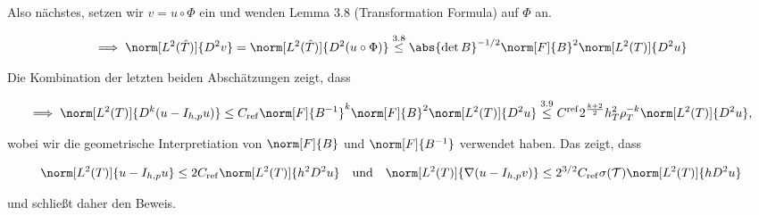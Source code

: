 \begin{solution}
\begin{enumerate}[label = \textbf{\alph*)}]
\begin{enumerate}[label = \arabic*.]
    Also nächstes, setzen wir $v = u \circ \Phi$ ein und wenden Lemma 3.8 (Transformation Formula) auf $\Phi$ an.

    \begin{align*}
      \implies
      \norm[L^2(\hat T)]{D^2 v}
      =
      \norm[L^2(\hat T)]{D^2 (u \circ \Phi)}
      \stackrel
      {
        \mathrm{3.8}
      }{\leq}
      \abs{\det B}^{-1/2} \norm[F]{B}^2 \norm[L^2(T)]{D^2 u}
    \end{align*}

    Die Kombination der letzten beiden Abschätzungen zeigt, dass

    \begin{align*}
      \implies
      \norm[L^2(T)]{D^k (u - I_{h, p} u)}
      \leq
      C_\mathrm{ref} \norm[F]{B^{-1}}^k \norm[F]{B}^2 \norm[L^2(T)]{D^2 u}
      \stackrel
      {
        \mathrm{3.9}
      }{\leq}
      C^\mathrm{ref} 2^\frac{k+2}{2} h_T^2 \rho_T^{-k} \norm[L^2(T)]{D^2 u},
    \end{align*}

    wobei wir die geometrische Interpretiation von $\norm[F]{B}$ und $\norm[F]{B^{-1}}$ verwendet haben.
    Das zeigt, dass

    \begin{align*}
      \norm[L^2(T)]{u - I_{h, p} u}
      \leq
      2 C_\mathrm{ref} \norm[L^2(T)]{h^2 D^2 u}
      \quad
      \text{und}
      \quad
      \norm[L^2(T)]{\nabla (u - I_{h, p} v)}
      \leq 2^{3/2} C_\mathrm{ref} \sigma(\mathcal{T}) \norm[L^2(T)]{h D^2 u}
    \end{align*}

    und schließt daher den Beweis.

  \end{enumerate}

\end{enumerate}

\end{solution}

